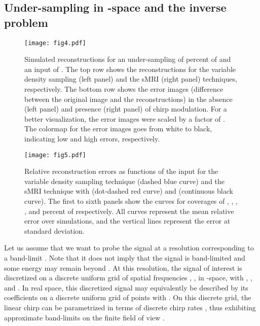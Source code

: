 \documentclass[10pt,draftcls, onecolumn]{IEEEtran}
\begin{document}
\subsection{Under-sampling in -space and the inverse problem}

\begin{figure}
\centering
\texttt{[image: fig4.pdf]}
\caption{\label{fig:simulated reconstruction 2D} Simulated reconstructions for an under-sampling of  percent of  and an input  of . The top row shows the reconstructions for the variable density sampling (left panel) and the sMRI (right panel) techniques, respectively. The bottom row shows the error images (difference between the original image and the reconstructions) in the absence (left panel) and presence (right panel) of chirp modulation. For a better visualization, the error images were scaled by a factor of . The colormap for the error images goes from white to black, indicating low and high errors, respectively.}
\end{figure}


\begin{figure*}
\centering
\texttt{[image: fig5.pdf]}
\caption{\label{fig:curves error 2D} Relative reconstruction errors as functions of the input  for the variable density sampling technique (dashed blue curve) and the sMRI technique with  (dot-dashed red curve) and  (continuous black curve). The first to sixth panels show the curves for coverages of , , , ,  and  percent of  respectively. All curves represent the mean relative error over  simulations, and the vertical lines represent the error at  standard deviation.}
\vspace{-3mm}
\end{figure*}


Let us assume that we want to probe the signal  at a resolution corresponding to a band-limit . Note that it does not imply that the signal is band-limited and some energy may remain beyond . At this resolution, the signal of interest is discretized on a discrete uniform grid of  spatial frequencies , , in -space, with , , and . In real space, this discretized signal may equivalently be described by its coefficients on a discrete uniform grid of  points  with . On this discrete grid, the linear chirp can be parametrized in terms of discrete chirp rates , thus exhibiting approximate band-limits  on the finite field of view .
\end{document}
